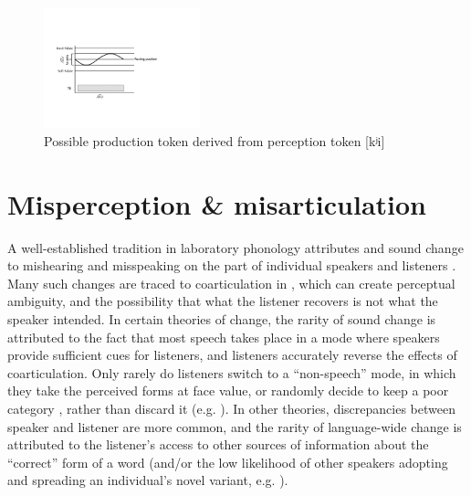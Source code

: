 \begin{figure}[H]
\centering{}\includegraphics[height=3.5cm]{figures/palatalizationc.pdf}\caption{\label{fig:Palatalizationc}Possible production token derived from
perception token {[}{kʲi}{]}}
\end{figure}


\section{\label{subsec:Misperception-=000026-Misarticulation}Misperception \& misarticulation}\largerpage

A well-established tradition in laboratory phonology attributes 
and  sound change to mishearing and misspeaking on the
part of individual speakers and listeners \citep{Ohala1980,Ohala1981,ohala1983origin,Ohala1990}.
Many such changes are traced to coarticulation in , which
can create perceptual ambiguity, and the possibility that what the
listener recovers is not what the speaker intended. In certain theories
of change, the rarity of sound change is attributed to the fact that
most speech takes place in a mode where speakers provide sufficient
cues for listeners, and listeners accurately reverse the effects of
coarticulation. Only rarely do listeners switch to a ``non-speech''
mode, in which they take the perceived forms at face value, or randomly
decide to keep a poor category , rather than discard it (e.g.
\citealp{lindblom1990explaining,Garrett2013}). In other theories,
discrepancies between speaker and listener are more common, and the
rarity of language-wide change is attributed to the listener's access
to other sources of information about the ``correct'' form of a word
(and/or the low likelihood of other speakers adopting and spreading
an individual's novel variant, e.g. \citealt{Ohala1980}). 

